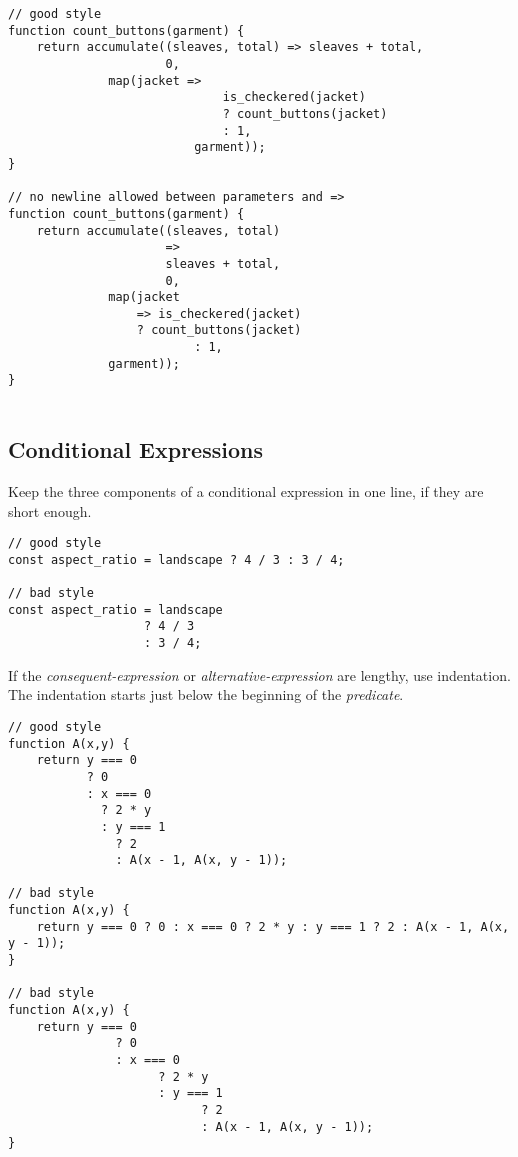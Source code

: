 \begin{lstlisting}
// good style
function count_buttons(garment) {
    return accumulate((sleaves, total) => sleaves + total,
                      0, 
		      map(jacket =>
                              is_checkered(jacket)
                              ? count_buttons(jacket)
                              : 1,
                          garment));
}

// no newline allowed between parameters and =>
function count_buttons(garment) {
    return accumulate((sleaves, total)
                      =>
                      sleaves + total,
                      0, 
		      map(jacket
		          => is_checkered(jacket)
		          ? count_buttons(jacket)
                          : 1,
			  garment));
}


\end{lstlisting}


  \subsection*{Conditional Expressions}
\label{condex}
Keep the three components of a conditional expression in one line, if they are short enough.

\begin{lstlisting}
// good style
const aspect_ratio = landscape ? 4 / 3 : 3 / 4;

// bad style
const aspect_ratio = landscape
                   ? 4 / 3
                   : 3 / 4;
\end{lstlisting}

If the \textit{consequent-expression} or \textit{alternative-expression} are lengthy, use
indentation. The indentation starts just below the beginning of the
\textit{predicate}.

\begin{lstlisting}
// good style
function A(x,y) {
    return y === 0
           ? 0
           : x === 0
             ? 2 * y
             : y === 1
               ? 2
               : A(x - 1, A(x, y - 1));

// bad style
function A(x,y) {
    return y === 0 ? 0 : x === 0 ? 2 * y : y === 1 ? 2 : A(x - 1, A(x, y - 1));
}

// bad style
function A(x,y) {
    return y === 0
               ? 0
               : x === 0
                     ? 2 * y
                     : y === 1
                           ? 2
                           : A(x - 1, A(x, y - 1));
}
\end{lstlisting}

